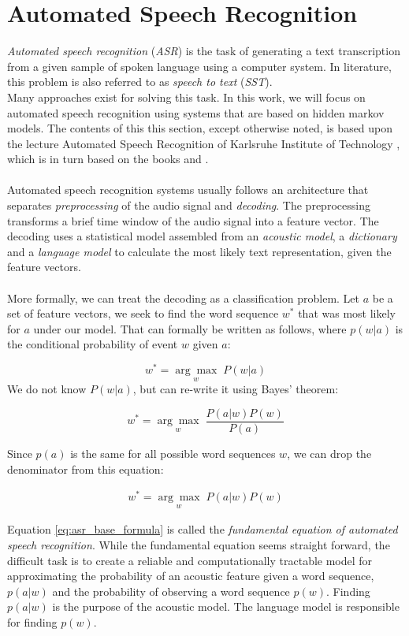 
\section{Automated Speech Recognition}
\label{ch:HMM_ASR}
\textit{Automated speech recognition} (\textit{ASR}) is the task of generating a text transcription from a given sample of spoken language using a computer system. In literature, this problem is also referred to as \textit{speech to text} (\textit{SST}). \\
Many approaches exist for solving this task. In this work, we will focus on automated speech recognition using systems that are based on hidden markov models. The contents of this this section, except otherwise noted, is based upon the lecture Automated Speech Recognition of Karlsruhe Institute of Technology \cite{kitasr2018stueker}, which is in turn based on the books \cite{schukat1995automatische} and \cite{huang2001spoken}. \\ \\
Automated speech recognition systems usually follows an architecture that separates \textit{preprocessing} of the audio signal and \textit{decoding}. The preprocessing transforms a brief time window of the audio signal into a feature vector. The decoding uses a statistical model assembled from an \textit{acoustic model}, a \textit{dictionary} and a \textit{language model} to calculate the most likely text representation, given the feature vectors.\\ \\

More formally, we can treat the decoding as a classification problem. Let $a$ be a set of feature vectors, we seek to find the word sequence $w^*$ that was most likely for $a$ under our model. That can formally be written as follows, where $p(w|a)$ is the conditional probability of event $w$ given $a$:

\[
w^* = \underset{w}{\arg \max} \; P(w|a)
\] 
We do not know $P(w|a)$, but can re-write it using Bayes' theorem:

\[
w^* = \underset{w}{\arg \max} \; \frac{P(a|w) P(w)}{P(a)}
\]

Since $p(a)$ is the same for all possible word sequences $w$, we can drop the denominator from this equation:

\begin{align}
w^* = \underset{w}{\arg \max} \; P(a|w) P(w)
\label{eq:asr_base_formula}
\end{align}

Equation \ref{eq:asr_base_formula} is called the \textit{fundamental equation of automated speech recognition}. While the fundamental equation seems straight forward, the difficult task is to create a reliable and computationally tractable model for approximating the probability of an acoustic feature given a word sequence, $p(a|w)$ and the probability of observing a word sequence $p(w)$. Finding $p(a|w)$ is the purpose of the acoustic model. The language model is responsible for finding $p(w)$. 

